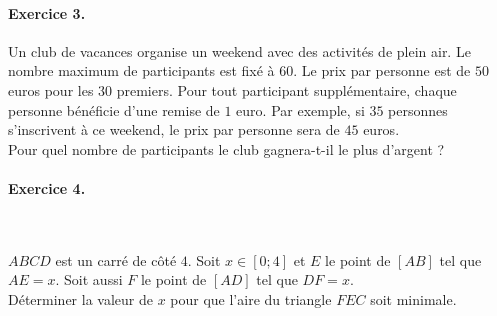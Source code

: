 \documentclass[11pt]{article}
\begin{document}
\paragraph{Exercice 3.} Un club de vacances organise un weekend avec des
activités de plein air. Le nombre maximum de participants est fixé à $60$. Le
prix par personne est de $50$ euros pour les $30$ premiers. Pour tout participant
supplémentaire, chaque personne bénéficie d'une remise de $1$ euro. Par exemple, si
$35$ personnes s'inscrivent à ce weekend, le prix par personne sera de $45$
euros.\\
Pour quel nombre de participants le club gagnera-t-il le plus d'argent ?
\paragraph{Exercice 4.}~\\
\begin{minipage}{.7\textwidth}
  $ABCD$ est un carré de côté $4$. Soit $x\in\left[ 0; 4 \right]$ et $E$ le
  point de $\left[ AB \right]$ tel que $AE=x$. Soit aussi $F$ le point de
  $\left[ AD \right]$ tel que $DF=x$.\\
  Déterminer la valeur de $x$ pour que l'aire du triangle $FEC$ soit minimale.
\end{minipage}
\begin{minipage}{.3\textwidth}
\begin{center}
\end{center}
\end{minipage}
\end{document}
